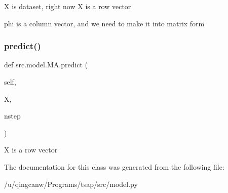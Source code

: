 \begin{DoxyVerb}X is dataset, right now X is a row vector\end{DoxyVerb}
\begin{DoxyVerb}phi is a column vector, and we need to make it into matrix form\end{DoxyVerb}
 \mbox{\label{classsrc_1_1model_1_1MA_af0d3f5582d13a5b653b7b3ca5a5c2c68}} 
\subsubsection{\texorpdfstring{predict()}{predict()}}
{\footnotesize\ttfamily def src.\+model.\+M\+A.\+predict (\begin{DoxyParamCaption}\item[{}]{self,  }\item[{}]{X,  }\item[{}]{nstep }\end{DoxyParamCaption})}

\begin{DoxyVerb}X is a row vector\end{DoxyVerb}
 

The documentation for this class was generated from the following file\+:\begin{DoxyCompactItemize}
\item 
/u/qingcanw/\+Programs/tsap/src/model.\+py\end{DoxyCompactItemize}
